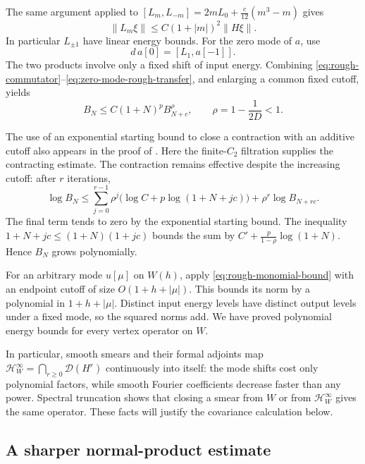 The same argument applied to
$[L_m,L_{-m}]=2mL_0+\frac c{12}(m^3-m)$ gives
\begin{equation}\label{eq:virasoro-linear-energy}
 \|L_m\xi\|\leq C(1+|m|)^2\|H\xi\|.
\end{equation}
In particular $L_{\pm1}$ have linear energy bounds.  For the zero mode
of $a$, use
\begin{equation}\label{eq:zero-mode-rough-transfer}
 d\,a[0]=[L_1,a[-1]].
\end{equation}
The two products involve only a fixed shift of input energy.  Combining
\eqref{eq:rough-commutator}--\eqref{eq:zero-mode-rough-transfer}, and
enlarging a common fixed cutoff, yields
\begin{equation}\label{eq:first-energy-contraction}
 B_N\leq C(1+N)^p B_{N+c}^{\rho},
 \qquad \rho=1-\frac1{2D}<1.
\end{equation}

The use of an exponential starting bound to close a contraction with an
additive cutoff also appears in the proof of
\cite[Theorem~4.5]{CarpiTomassini}. Here the finite-$C_2$ filtration
supplies the contracting estimate. The contraction remains effective
despite the increasing cutoff: after $r$ iterations,
\[
 \log B_N\leq
 \sum_{j=0}^{r-1}\rho^j
       \bigl(\log C+p\log(1+N+jc)\bigr)
       +\rho^r\log B_{N+rc}.
\]
The final term tends to zero by the exponential starting bound.  The
inequality $1+N+jc\leq(1+N)(1+jc)$ bounds the sum by
$C'+\frac p{1-\rho}\log(1+N)$.  Hence $B_N$ grows polynomially.

For an arbitrary mode $u[\mu]$ on $W(h)$, apply
\eqref{eq:rough-monomial-bound} with an endpoint cutoff of size
$O(1+h+|\mu|)$.  This bounds its norm by a polynomial in
$1+h+|\mu|$.  Distinct input energy levels have distinct output levels
under a fixed mode, so the squared norms add.  We have proved polynomial
energy bounds for every vertex operator on $W$.

In particular, smooth smears and their formal adjoints map
$\mathcal H_W^\infty=\bigcap_{r\geq0}\mathcal D(H^r)$ continuously
into itself: the mode shifts cost only polynomial factors, while smooth
Fourier coefficients decrease faster than any power.  Spectral
truncation shows that closing a smear from $W$ or from
$\mathcal H_W^\infty$ gives the same operator.  These facts will justify
the covariance calculation below.

\subsection{A sharper normal-product estimate}

